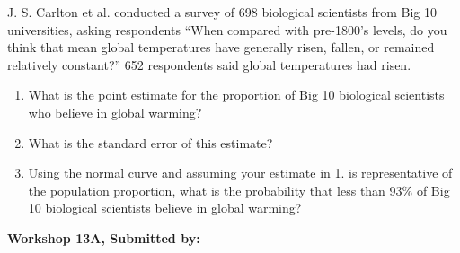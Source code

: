 \documentclass[11pt, chapterprefix=true]{scrbook}\usepackage[]{graphicx}\usepackage[]{color}
\begin{document}
\begin{exercises}
\begin{exercise}
\begin{center}
\end{center}

J. S. Carlton et al. conducted a survey of 698 biological scientists from Big 10 universities, asking respondents ``When compared with pre-1800's levels, do you think that mean global temperatures have generally risen, fallen, or remained relatively constant?'' 652 respondents said global temperatures had risen.
 
\begin{enumerate}
  \item What is the point estimate for the proportion of Big 10 biological scientists who believe in global warming?
  \item What is the standard error of this estimate?
  \item Using the normal curve and assuming your estimate in 1. is representative of the population proportion, what is the probability that less than 93\% of Big 10 biological scientists believe in global warming?
\end{enumerate}

\end{exercise} 
\begin{solution}  %

\end{solution}


\clearpage

    \begin{exercise}  %
    
    \begin{center}
\begin{flushleft}\textbf{\large \hfill Workshop 13A, Submitted by: }\end{flushleft}


\end{center}
\end{exercise}
\end{exercises}
\end{document}
